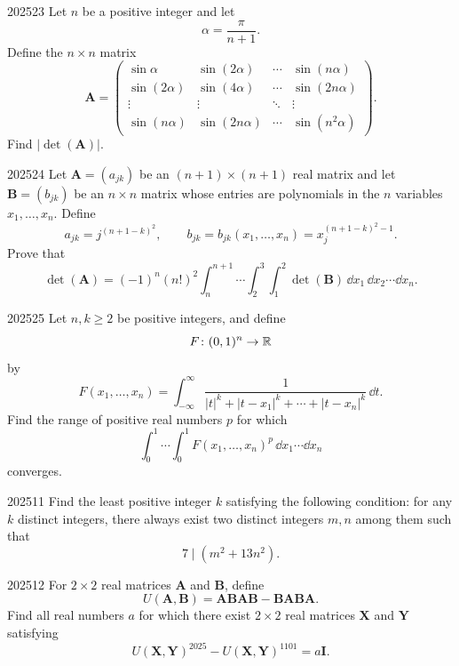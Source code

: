 \begin{problem}{2025}{2}{3}
Let $n$ be a positive integer and let
\[
    \alpha=\frac\pi{n+1}.
\]
Define the $n\times n$ matrix
\[
    \mathbf A=
    \begin{pmatrix}
        \sin\alpha & \sin(2\alpha) & \cdots & \sin(n\alpha)\\
        \sin(2\alpha) & \sin(4\alpha) & \cdots & \sin(2n\alpha)\\
        \vdots & \vdots & \ddots & \vdots\\
        \sin(n\alpha) & \sin(2n\alpha) & \cdots & \sin(n^2\alpha)
    \end{pmatrix}.
\]
Find $|\det(\mathbf A)|$.
\end{problem}

\begin{problem}{2025}{2}{4}
Let $\mathbf A=(a_{jk})$ be an $(n+1)\times(n+1)$ real matrix and let $\mathbf B=(b_{jk})$ be an $n\times n$ matrix whose entries are polynomials in the $n$ variables $x_1, \dots, x_n$. Define
\[
    a_{jk}=j^{(n+1-k)^2},
    \qquad
    b_{jk}=b_{jk}(x_1, \dots, x_n)
    =x_j^{(n+1-k)^2-1}.
\]
Prove that
\[
    \det(\mathbf A)
    =(-1)^n(n!)^2
    \int_n^{n+1}\cdots
    \int_2^3\int_1^2
    \det(\mathbf B)\,
    \dd x_1\, \dd x_2\cdots\dd x_n.
\]
\end{problem}

\begin{problem}{2025}{2}{5}
Let $n, k\ge2$ be positive integers, and define
\[
    F\colon(0, 1)^n\to\mathbb{R}
\]
by
\[
    F(x_1, \dots, x_n)
    =
    \int_{-\infty}^{\infty}
    \frac{1}{|t|^k+|t-x_1|^k+\cdots+|t-x_n|^k}\, \dd t.
\]
Find the range of positive real numbers $p$ for which
\[
    \int_0^1\cdots\int_0^1
    F(x_1, \dots, x_n)^p\,
    \dd x_1\cdots\dd x_n
\]
converges.
\end{problem}

\begin{problem}{2025}{1}{1}
Find the least positive integer $k$ satisfying the following condition: for any $k$ distinct integers, there always exist two distinct integers $m, n$ among them such that
\[
    7\mid(m^2+13n^2).
\]
\end{problem}

\begin{problem}{2025}{1}{2}
For $2\times2$ real matrices $\mathbf A$ and $\mathbf B$, define
\[
    U(\mathbf A, \mathbf B)
    =\mathbf A\mathbf B\mathbf A\mathbf B
    -\mathbf B\mathbf A\mathbf B\mathbf A.
\]
Find all real numbers $a$ for which there exist $2\times2$ real matrices $\mathbf X$ and $\mathbf Y$ satisfying
\[
    U(\mathbf X, \mathbf Y)^{2025}
    -U(\mathbf X, \mathbf Y)^{1101}
    =a\mathbf I.
\]
\end{problem}

